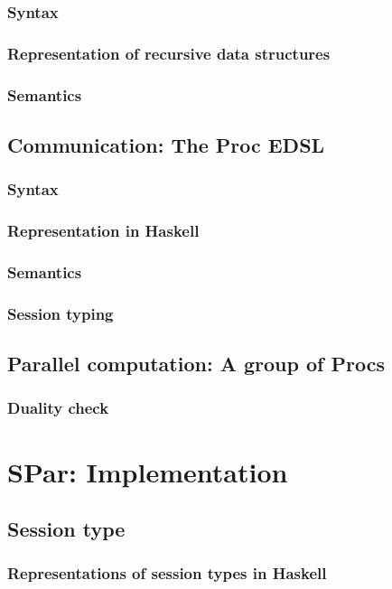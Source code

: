 \documentclass[a4paper, twoside]{report}
\begin{document}
\subsection{Syntax}
\subsection{Representation of recursive data structures}
\subsection{Semantics}
\section{Communication: The Proc EDSL}
\subsection{Syntax}
\subsection{Representation in Haskell}
\subsection{Semantics}
\subsection{Session typing}
\section{Parallel computation: A group of Procs}
\subsection{Duality check}

\chapter{SPar: Implementation}
\section{Session type}
\subsection{Representations of session types in Haskell}
\end{document}
